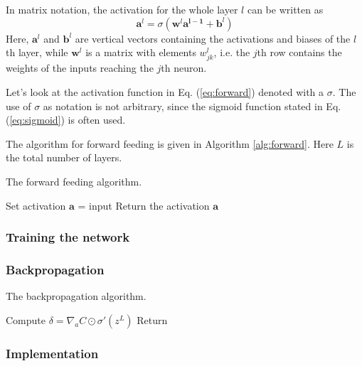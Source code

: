 In matrix notation, the activation for the whole layer $l$ can be written as
\begin{equation}\label{eq:forward}
	\boldsymbol{a}^l = \sigma\left(\boldsymbol{w}^l\boldsymbol{a^{l-1}}+\boldsymbol{b}^l\right)
\end{equation}
Here, $\boldsymbol{a}^l$ and $\boldsymbol{b}^l$ are vertical vectors containing the activations and biases of the $l$th layer, while $\boldsymbol{w}^l$ is a matrix with elements $w^l_{jk}$, i.e. the $j$th row contains the weights of the inputs reaching the $j$th neuron.

Let's look at the activation function in Eq. (\ref{eq:forward}) denoted with a $\sigma$. The use of $\sigma$ as notation is not arbitrary, since the sigmoid function stated in Eq. (\ref{eq:sigmoid}) is often used.

The algorithm for forward feeding is given in Algorithm \ref{alg:forward}. Here $L$ is the total number of layers.
\begin{algorithm}[htbp]\caption{The forward feeding algorithm.}\label{alg:forward}
	\SetAlgoLined
	\BlankLine
	\BlankLine
	Set activation $\boldsymbol{a}$ = input\;
	Return the activation $\boldsymbol{a}$\;
	\BlankLine
	\BlankLine
\end{algorithm}

\subsubsection*{Training the network}

\subsubsection*{Backpropagation}

\begin{algorithm}[htbp]\caption{The backpropagation algorithm.}\label{alg:backprop}
	\SetAlgoLined
	\BlankLine
	\BlankLine
	Compute $\delta=\nabla_aC\odot\sigma'(z^L)$\;
	Return \;
	\BlankLine
	\BlankLine
	\end{algorithm}

\subsubsection*{Implementation}
